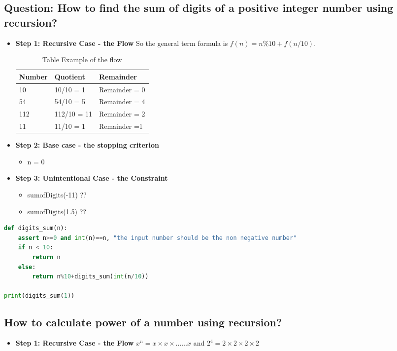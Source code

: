\documentclass[10pt,letterpaper]{article}
\begin{document}
\subsection{Question: How to find the sum of digits of a positive integer number using recursion?}

\begin{itemize}
\item \textbf{Step 1: Recursive Case - the Flow} So the general term formula is $f(n)=n\%10+f(n/10)$.\\

\begin{table}[h!]
\centering
\caption{Table Example of the flow}
\begin{tabular}{| l | l | l |}
\hline
\textbf{Number}&\textbf{Quotient}&\textbf{Remainder} \\
\hline
10 & 10/10 = 1 & Remainder = 0 \\
54 & 54/10 = 5 & Remainder = 4 \\
112 & 112/10 = 11 & Remainder = 2\\
11 & 11/10 = 1 & Remainder =1 \\
\hline
\end{tabular}
\end{table}

\item \textbf{Step 2: Base case - the stopping criterion}
\begin{itemize}
\item n = 0
\end{itemize}

\item \textbf{Step 3: Unintentional Case - the Constraint}
\begin{itemize}
\item sumofDigits(-11) ??
\item sumofDigits(1.5) ??
\end{itemize}
\end{itemize}
\begin{lstlisting}[language=Python, caption=Solution for Sum of Digits in Recursion]
def digits_sum(n):
	assert n>=0 and int(n)==n, "the input number should be the non negative number"
	if n < 10:
		return n
	else:
		return n%10+digits_sum(int(n/10))

print(digits_sum(1))
\end{lstlisting}

\subsection{How to calculate power of a number using recursion?}
\begin{itemize}
\item \textbf{Step 1: Recursive Case - the Flow} $x^{n}=x \times x \times \ldots \ldots x$ and $2^{4}=2 \times 2 \times 2 \times 2$

\end{itemize}
\end{document}
